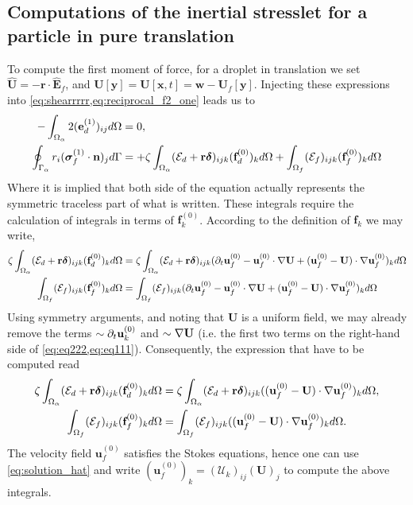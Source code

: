 \subsection{Computations of the inertial stresslet for a particle in pure translation}

To compute the first moment of force, for a droplet in translation we set $\hat{\textbf{U}} = - \textbf{r} \cdot \hat{\textbf{E}}_f$, and $\textbf{U}[\textbf{y}] = \textbf{U}[\textbf{x},t] = \textbf{w} - \textbf{U}_f[\textbf{y}]$. 
Injecting these expressions into \ref{eq:shearrrrr,eq:reciprocal_f2_one} leads us to
\begin{align}
    - \intO{
        2(\textbf{e}_d^{(1)})_{ij}
   }
    &= 0, \\
    \intS{r_i (\bm\sigma_f^{(1)} \cdot \textbf{n})_j}
    &= 
    + \zeta\intO{(\mathcal{E}_d + \textbf{r}\bm\delta)_{ijk} (\textbf{f}_d^{(0)})_k }
    + \intOf{(\mathcal{E}_f )_{ijk}  (\textbf{f}^{(0)}_f)_k}
    \label{eq:stresslet}
\end{align}
Where it is implied that both side of the equation actually represents the symmetric traceless part of what is written.
These integrals require the calculation of integrals in terms of $\textbf{f}^{(0)}_k$. 
According to the definition of $\textbf{f}_k$ we may write, 
\begin{align}
    \label{eq:eq111}
    \zeta\intO{(\mathcal{E}_d + \textbf{r}\bm\delta)_{ijk} (\textbf{f}_d^{(0)})_k }
    &=
    \zeta\intO{(\mathcal{E}_d + \textbf{r}\bm\delta)_{ijk} 
    (
    \pddt \textbf{u}_f^{(0)}
    - \textbf{u}_f^{(0)} \cdot \grad \textbf{U}
    + (\textbf{u}_f^{(0)} - \textbf{U})\cdot \grad \textbf{u}_f^{(0)}
    )_k }\\
    \intOf{(\mathcal{E}_f )_{ijk}  (\textbf{f}^{(0)}_f)_k}
    &=
    \intOf{(\mathcal{E}_f )_{ijk}  
    (\pddt \textbf{u}_f^{(0)}
    - \textbf{u}_f^{(0)} \cdot \grad \textbf{U}
    + (\textbf{u}_f^{(0)} - \textbf{U})\cdot \grad \textbf{u}_f^{(0)}
    )_k}
    \label{eq:eq222}
\end{align}
Using symmetry arguments, and noting that  \textbf{U} is a uniform field, we may already remove the terms $\sim \partial_t \textbf{u}^{(0)}_k$ and $\sim \mathbf{\nabla} \textbf{U}$ (i.e. the first two terms on the right-hand side of \ref{eq:eq222,eq:eq111}). 
Consequently, the expression that have to be computed read
\begin{align}
    \zeta\intO{(\mathcal{E}_d + \textbf{r}\bm\delta)_{ijk} (\textbf{f}_d^{(0)})_k }
    &=
    \zeta\intO{(\mathcal{E}_d + \textbf{r}\bm\delta)_{ijk} 
    ( (\textbf{u}_f^{(0)} - \textbf{U})\cdot \grad \textbf{u}_f^{(0)}
    )_k },
    \label{eq:eq111222}
    \\
    \intOf{(\mathcal{E}_f )_{ijk}  (\textbf{f}^{(0)}_f)_k}
    &=
    \intOf{(\mathcal{E}_f )_{ijk}  
    ((\textbf{u}_f^{(0)} - \textbf{U})\cdot \grad \textbf{u}_f^{(0)}
    )_k}. 
    \label{eq:eq222222222}
\end{align}
The velocity field $\textbf{u}_f^{(0)}$ satisfies the Stokes equations, hence one can use \ref{eq:solution_hat} and write $(\textbf{u}_f^{(0)})_k = (\mathcal{U}_k)_{ij}(\textbf{U})_j$ to compute the above integrals. 

